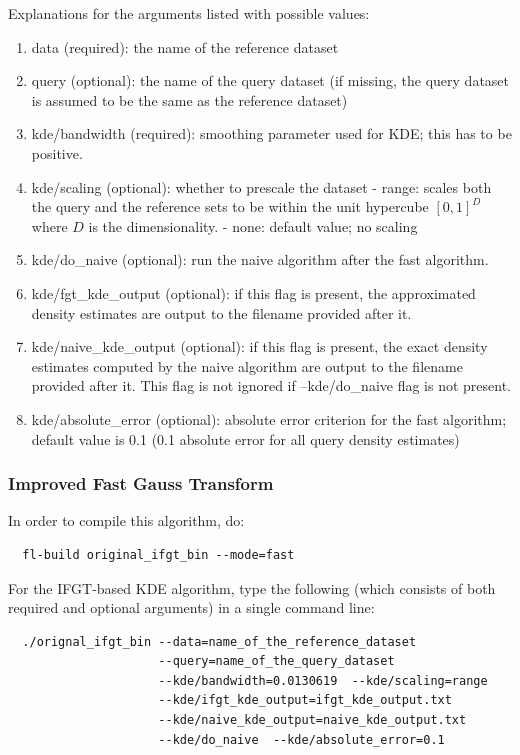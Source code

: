 \documentclass[letter]{report}
\begin{document}
Explanations for the arguments listed with possible values:

\begin{enumerate}
\item{data (required): the name of the reference dataset}
\item{query (optional): the name of the query dataset (if missing, the
 query dataset is assumed to be the same as the reference dataset)}
\item{kde/bandwidth (required): smoothing parameter used for KDE; this
 has to be positive.}
\item{kde/scaling (optional): whether to prescale the dataset - range:
scales both the query and the reference sets to be within the unit
hypercube $[0, 1]^D$ where $D$ is the dimensionality.  - none: default
value; no scaling}
\item{kde/do\_naive (optional): run the naive algorithm after the fast
algorithm.}
\item{kde/fgt\_kde\_output (optional): if this flag is present, the
approximated density estimates are output to the filename provided
after it.}
\item{kde/naive\_kde\_output (optional): if this flag is present, the
 exact density estimates computed by the naive algorithm are output to
 the filename provided after it. This flag is not ignored if
 --kde/do\_naive flag is not present.}
\item{kde/absolute\_error (optional): absolute error criterion for the
 fast algorithm; default value is 0.1 (0.1 absolute error for all
 query density estimates)}
\end{enumerate}

\subsubsection{Improved Fast Gauss Transform}
In order to compile this algorithm, do: 
\begin{verbatim}
  fl-build original_ifgt_bin --mode=fast
\end{verbatim}

For the IFGT-based KDE algorithm, type the
following (which consists of both required and optional arguments) in
a single command line:
\begin{verbatim}
  ./orignal_ifgt_bin --data=name_of_the_reference_dataset
                     --query=name_of_the_query_dataset
                     --kde/bandwidth=0.0130619  --kde/scaling=range
                     --kde/ifgt_kde_output=ifgt_kde_output.txt
                     --kde/naive_kde_output=naive_kde_output.txt
                     --kde/do_naive  --kde/absolute_error=0.1
\end{verbatim}
\end{document}

